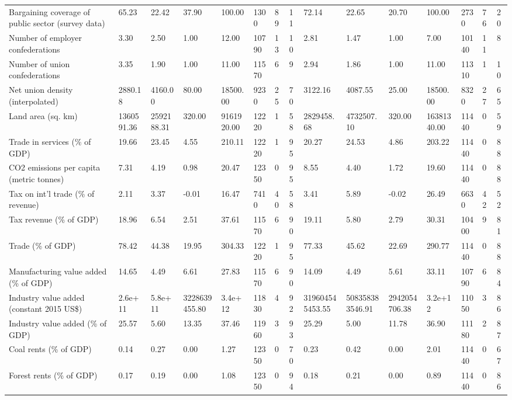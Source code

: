 \begin{longtable}{lllllllllllllll}
\addlinespace
Bargaining coverage of public sector (survey data) & 65.23 & 22.42 & 37.90 & 100.00 & 1300 & 89 & 11 & 72.14 & 22.65 & 20.70 & 100.00 & 2730 & 76 & 20\\
Number of employer confederations & 3.30 & 2.50 & 1.00 & 12.00 & 10790 & 13 & 10 & 2.81 & 1.47 & 1.00 & 7.00 & 10140 & 11 & 8\\
Number of union confederations & 3.35 & 1.90 & 1.00 & 11.00 & 11570 & 6 & 9 & 2.94 & 1.86 & 1.00 & 11.00 & 11310 & 1 & 10\\
Net union density (interpolated) & 2880.18 & 4160.00 & 80.00 & 18500.00 & 9230 & 25 & 70 & 3122.16 & 4087.55 & 25.00 & 18500.00 & 8320 & 27 & 65\\
Land area (sq. km) & 1360591.36 & 2592188.31 & 320.00 & 9161920.00 & 12220 & 1 & 58 & 2829458.68 & 4732507.10 & 320.00 & 16381340.00 & 11440 & 0 & 59\\
\addlinespace
Trade in services (\% of GDP) & 19.66 & 23.45 & 4.55 & 210.11 & 12220 & 1 & 95 & 20.27 & 24.53 & 4.86 & 203.22 & 11440 & 0 & 88\\
CO2 emissions per capita (metric tonnes) & 7.31 & 4.19 & 0.98 & 20.47 & 12350 & 0 & 95 & 8.55 & 4.40 & 1.72 & 19.60 & 11440 & 0 & 88\\
Tax on int'l trade (\% of revenue) & 2.11 & 3.37 & -0.01 & 16.47 & 7410 & 40 & 58 & 3.41 & 5.89 & -0.02 & 26.49 & 6630 & 42 & 52\\
Tax revenue (\% of GDP) & 18.96 & 6.54 & 2.51 & 37.61 & 11570 & 6 & 90 & 19.11 & 5.80 & 2.79 & 30.31 & 10400 & 9 & 81\\
Trade (\% of GDP) & 78.42 & 44.38 & 19.95 & 304.33 & 12220 & 1 & 95 & 77.33 & 45.62 & 22.69 & 290.77 & 11440 & 0 & 88\\
\addlinespace
Manufacturing value added (\% of GDP) & 14.65 & 4.49 & 6.61 & 27.83 & 11570 & 6 & 90 & 14.09 & 4.49 & 5.61 & 33.11 & 10790 & 6 & 84\\
Industry value added (constant 2015 US\$) & 2.6e+11 & 5.8e+11 & 3228639455.80 & 3.4e+12 & 11830 & 4 & 92 & 319604545453.55 & 508358383546.91 & 2942054706.38 & 3.2e+12 & 11050 & 3 & 86\\
Industry value added (\% of GDP) & 25.57 & 5.60 & 13.35 & 37.46 & 11960 & 3 & 93 & 25.29 & 5.00 & 11.78 & 36.90 & 11180 & 2 & 87\\
Coal rents (\% of GDP) & 0.14 & 0.27 & 0.00 & 1.27 & 12350 & 0 & 70 & 0.23 & 0.42 & 0.00 & 2.01 & 11440 & 0 & 67\\
Forest rents (\% of GDP) & 0.17 & 0.19 & 0.00 & 1.08 & 12350 & 0 & 94 & 0.18 & 0.21 & 0.00 & 0.89 & 11440 & 0 & 86\\

\end{longtable}
